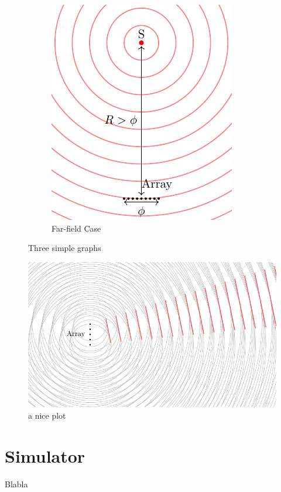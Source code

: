 \begin{figure}
\begin{subfigure}[b]{0.45\textwidth}
    \includegraphics[width=\textwidth]{FarField.pdf}
    \caption{Far-field Case}
    \label{fig:three sin x}
  \end{subfigure}
  \caption{Three simple graphs}
  \label{fig:three graphs}
\end{figure}



\begin{figure}
  \centering
  \includegraphics[]{beamforming_1.pdf}
  \caption{a nice plot}
  \label{fig:mesh1}
\end{figure}

\newpage
\section{Simulator}
Blabla
